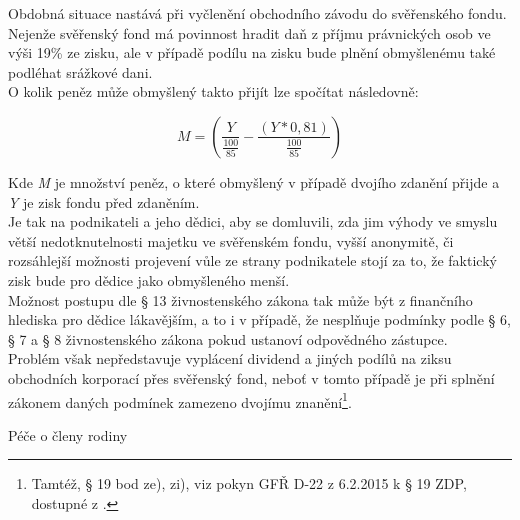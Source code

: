 \documentclass{article}
\begin{document}
Obdobná situace nastává při vyčlenění obchodního závodu do svěřenského fondu. Nejenže svěřenský fond má povinnost hradit daň z příjmu právnických osob ve výši 19\% ze zisku, ale v případě podílu na zisku bude plnění obmyšlenému také podléhat srážkové dani.\\

O kolik peněz může obmyšlený takto přijít lze spočítat následovně:

\begin{center}
$$ M = \left( \frac{Y}{\frac{100}{85}} - \frac{(Y * 0,81)}{\frac{100}{85}} \right)  $$ 	
\end{center}

Kde \textit{M} je množství peněz, o které obmyšlený v případě dvojího zdanění přijde a \textit{Y} je zisk fondu před zdaněním.\\

Je tak na podnikateli a jeho dědici, aby se domluvili, zda jim výhody ve smyslu větší nedotknutelnosti majetku ve svěřenském fondu, vyšší anonymitě, či rozsáhlejší možnosti projevení vůle ze strany podnikatele stojí za to, že faktický zisk bude pro dědice jako obmyšleného menší.\\

Možnost postupu dle § 13 živnostenského zákona tak může být z finančního hlediska pro dědice lákavějším, a to i v případě, že nesplňuje podmínky podle § 6, § 7 a § 8 živnostenského zákona pokud ustanoví odpovědného zástupce.\\

Problém však nepředstavuje vyplácení dividend a jiných podílů na ziksu obchodních korporací přes svěřenský fond, neboť v tomto případě je při splnění zákonem daných podmínek zamezeno dvojímu znanění\footnote{Tamtéž, § 19 bod ze), zi), viz pokyn GFŘ D-22 z 6.2.2015 k § 19 ZDP, dostupné z .}.\\

 
 \newpage
 \thispagestyle{smallertextinheader}
 
  \begin{enumerate}
 {\Large\item[5.] Péče o členy rodiny}
 \end{enumerate}
 
\end{document}
